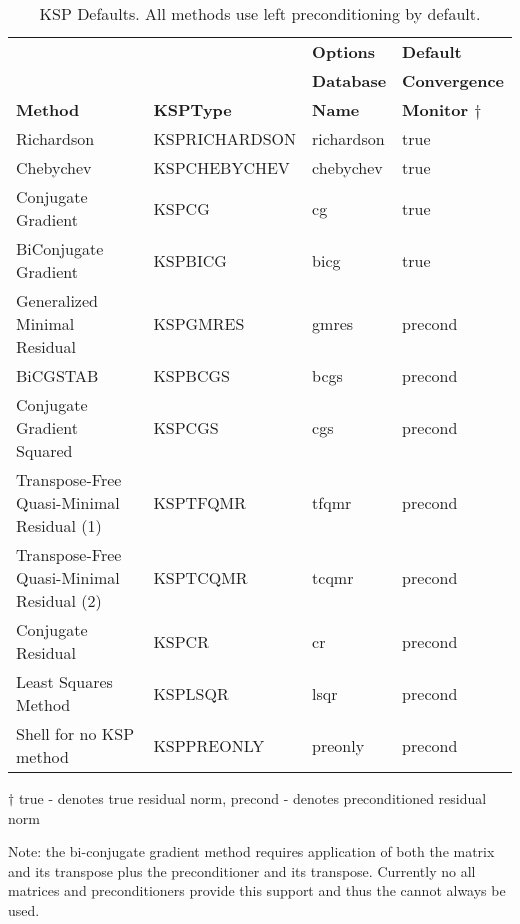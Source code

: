 \begin{table}
\begin{center}
\begin{tabular}{llll}
& & {\bf Options}       & {\bf Default}\\
& & {\bf Database}      & {\bf Convergence}\\
{\bf Method}    &{\bf KSPType}  & {\bf Name}    & {\bf Monitor $ \dagger $}\\
\hline
Richardson                                & KSPRICHARDSON & richardson  & true\\
Chebychev                                 & KSPCHEBYCHEV  & chebychev   & true\\
Conjugate Gradient \cite{hs:52}           & KSPCG         & cg          & true\\
BiConjugate Gradient                      & KSPBICG       & bicg        & true\\
Generalized Minimal Residual \cite{ss:86} & KSPGMRES      & gmres       & precond\\
BiCGSTAB \cite{v:92}                      & KSPBCGS       & bcgs        & precond \\
Conjugate Gradient Squared \cite{so:89}   & KSPCGS        & cgs         & precond \\
Transpose-Free Quasi-Minimal Residual (1) \cite{f:93} & KSPTFQMR & tfqmr & precond \\
Transpose-Free Quasi-Minimal Residual (2) & KSPTCQMR & tcqmr & precond \\
Conjugate Residual                        & KSPCR         & cr          & precond \\
Least Squares Method                      & KSPLSQR       & lsqr        & precond \\
Shell for no KSP method                   & KSPPREONLY    & preonly     & precond \\
\hline
\end{tabular}
\medskip \medskip
$ \dagger $ true - denotes true residual norm, precond - denotes preconditioned residual norm
\end{center}
\caption{KSP Defaults.  All methods use left preconditioning by default.}
\label{tab:kspdefaults}
\end{table}

Note: the bi-conjugate gradient method requires application of both the matrix and 
its transpose plus the preconditioner and its transpose. Currently no all matrices
and preconditioners provide this support and thus the  cannot always 
be used.  

